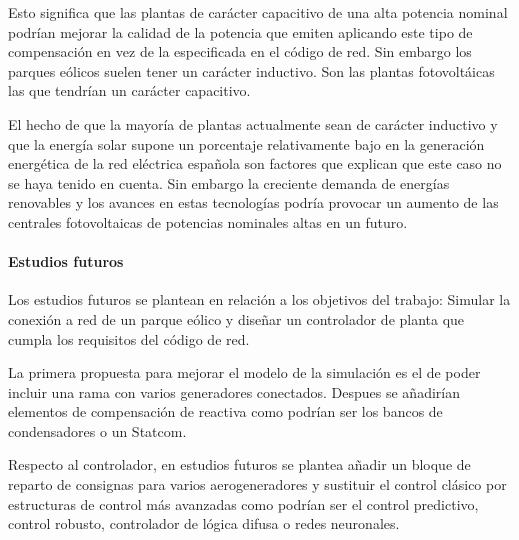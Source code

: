 \documentclass{book}
\begin{document}
\begin{enumerate}[1.]
Esto significa que las plantas de car\'acter capacitivo de una alta potencia nominal podr\'ian mejorar la calidad de la potencia que emiten aplicando este tipo de compensaci\'on en vez de la especificada en el c\'odigo de red. Sin embargo los parques e\'olicos suelen tener un car\'acter inductivo. Son las plantas fotovolt\'aicas las que tendr\'ian un car\'acter capacitivo. \par

El hecho de que la mayor\'ia de plantas actualmente sean de car\'acter inductivo y que la energ\'ia solar supone un porcentaje relativamente bajo en la generaci\'on energ\'etica de la red el\'ectrica española son factores que explican que este caso no se haya tenido en cuenta. Sin embargo la creciente demanda de energ\'ias renovables y los avances en estas tecnolog\'ias podr\'ia provocar un aumento de las centrales fotovoltaicas de potencias nominales altas en un futuro. \par

\end{enumerate}

	\paragraph{Estudios futuros}

Los estudios futuros se plantean en relaci\'on a los objetivos del trabajo: Simular la conexi\'on a red de un parque e\'olico y diseñar un controlador de planta que cumpla los requisitos del c\'odigo de red.\par

La primera propuesta para mejorar el modelo de la simulaci\'on es el de poder incluir una rama con varios generadores conectados. Despues se añadir\'ian elementos de compensaci\'on de reactiva como podr\'ian ser los bancos de condensadores o un Statcom. \par

Respecto al controlador, en estudios futuros se plantea añadir un bloque de reparto de consignas para varios aerogeneradores y sustituir el control cl\'asico por estructuras de control m\'as avanzadas como podr\'ian ser el control predictivo, control robusto, controlador de l\'ogica difusa o redes neuronales. \par



\end{document}
